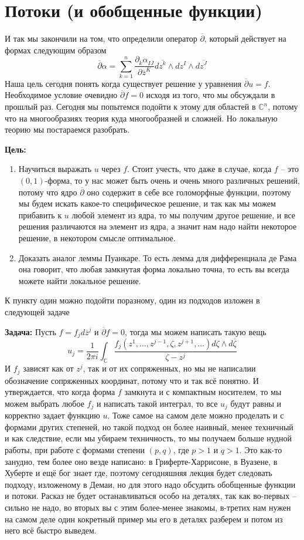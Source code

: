 \chapter{Потоки (и обобщенные функции)}
И так мы закончили на том, что определили оператор $\overline\partial$, который
действует на формах следующим образом
\[\overline\partial\alpha=\sum_{k=1}^n\frac{\partial_{\overline k}\alpha_{I\overline J}}{\partial
\overline z^K}d\overline{z^k}\wedge dz^I\wedge d\overline{z^J}\]
Наша цель сегодня понять когда существует решение у уравнения $\overline\partial
u=f$. Необходимое условие очевидно $\overline\partial f=0$ исходя из того, что
мы обсуждали в прошлый раз. Сегодня мы попытемся подойти к этому для областей в
$\mathbb C^n$, потому что на многообразиях теория куда многообразней и сложней.
Но локальную теорию мы постараемся разобрать.

\textbf{Цель:}
\begin{enumerate}
    \item Научиться выражать $u$ через $f$. Стоит учесть, что даже в случае,
        когда $f$ – это $(0,1)$-форма, то у нас может быть очень и очень
        много различных решений, потому что ядро $\overline\partial$ оно
        содержит в себе все голоморфные функции, поэтому мы будем искать
        какое-то специфическое решение, и так как мы можем прибавить к $u$
        любой элемент из ядра, то мы получим другое решение, и все решения
        различаются на элемент из ядра, а значит нам надо найти некоторое
        решение, в некотором смысле оптимальное.
    \item Доказать аналог леммы Пуанкаре. То есть лемма для дифференциала де Рама
        она говорит, что любая замкнутая форма локально точна, то есть вы всегда
        можете найти локальное решение.
\end{enumerate}

К пункту один можно подойти поразному, один из подходов изложен в следующей
задаче

\textbf{Задача:}
Пусть $f=f_jd\overline z^j$ и $\overline\partial f=0$, тогда мы можем написать
такую вещь
\[u_j=\frac{1}{2\pi i}\int_{\mathbb C}\frac{f_j(z^1,\ldots,z^{j-1},\zeta,z^{j+1},\ldots)d\zeta\wedge d\overline\zeta}
{\zeta-z^j}
\]
И $f_j$ зависят как от $z^j$, так и от их сопряженных, но мы не написалии обозначение
сопряженных координат, потому что и так всё понятно. И утверждается, что когда форма
$f$ замкнута и с компактным носителем, то мы можем выбрать любое $f_j$ и написать
такой интеграл, то все $u_j$ будут равны и корректно задает функцию $u$. Тоже
самое на самом деле можно проделать и с формами других степеней, но такой подход
он более наивный, менее техничный и как следствие, если мы убираем техничность,
то мы получаем больше нудной работы, при работе с формами степени $(p,q)$, где
$p>1$ и $q>1$. Это как-то занудно, тем более оно везде написано: в Гриферте-Харрисоне,
в Вуазене, в Хуберте и ещё бог знает где, поэтому сегодняшняя лекция будет следовать
подходу, изложеному в Демаи, но для этого надо обсудить обобщенные функции и потоки.
Расказ не будет останавливаться особо на деталях, так как во-первых – сильно не
надо, во вторых вы с этим более-менее знакомы, в-третих нам нужен на самом деле
один кокретный пример мы его в деталях разберем и потом из него всё быстро
выведем.

